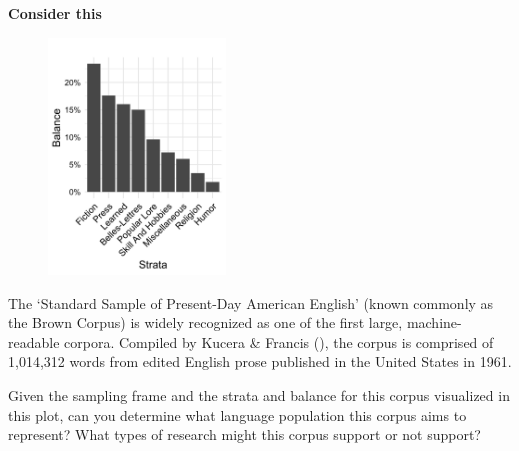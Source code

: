 \documentclass[
  letterpaper,
  krantz1]{latex/krantz-mod}
\theoremstyle{definition}
\theoremstyle{definition}
\theoremstyle{remark}
\begin{document}
\begin{tcolorbox}[enhanced jigsaw, toprule=.15mm, breakable, colback=white, arc=.35mm, left=2mm, colframe=quarto-callout-color-frame, opacityback=0, bottomrule=.15mm, rightrule=.15mm, leftrule=.75mm]

\textbf{ Consider this}

\begin{figure}
  \vspace{-20pt}%
  \centering
  \includegraphics[width=0.42\textwidth]{part_2/figures/fig-brown-corpus.png}
\end{figure}

The `Standard Sample of Present-Day American English' (known commonly as
the Brown Corpus) is widely recognized as one of the
first large, machine-readable corpora. Compiled by Kucera \& Francis
(), the corpus is comprised of 1,014,312
words from edited English prose published in the United States in 1961.

Given the sampling frame and the strata and
balance for this corpus visualized in this plot, can you determine what
language population this corpus aims to represent? What types of
research might this corpus support or not support?

\end{tcolorbox}
\end{document}
